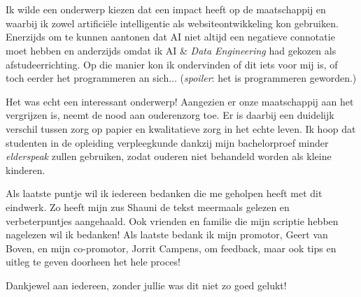 
\chapter*{}
\label{ch:voorwoord}




Ik wilde een onderwerp kiezen dat een impact heeft op de maatschappij en waarbij ik zowel artificiële intelligentie als websiteontwikkeling kon gebruiken. Enerzijds om te kunnen aantonen dat AI niet altijd een negatieve connotatie moet hebben en anderzijds omdat ik AI \& \textit{Data Engineering} had gekozen als afstudeerrichting. Op die manier kon ik ondervinden of dit iets voor mij is, of toch eerder het programmeren an sich$\ldots$ (\textit{spoiler}: het is programmeren geworden.)

Het was echt een interessant onderwerp! Aangezien er onze maatschappij aan het vergrijzen is, neemt de nood aan ouderenzorg toe. Er is daarbij een duidelijk verschil tussen zorg op papier en kwalitatieve zorg in het echte leven. Ik hoop dat studenten in de opleiding verpleegkunde dankzij mijn bachelorproef minder \textit{elderspeak} zullen gebruiken, zodat ouderen niet behandeld worden als kleine kinderen.

Als laatste puntje wil ik iedereen bedanken die me geholpen heeft met dit eindwerk. Zo heeft mijn zus Shauni de tekst meermaals gelezen en verbeterpuntjes aangehaald. Ook vrienden en familie die mijn scriptie hebben nagelezen wil ik bedanken!
Als laatste bedank ik mijn promotor, Geert van Boven, en mijn co-promotor, Jorrit Campens, om feedback, maar ook tips en uitleg te geven doorheen het hele proces!

Dankjewel aan iedereen, zonder jullie was dit niet zo goed gelukt!